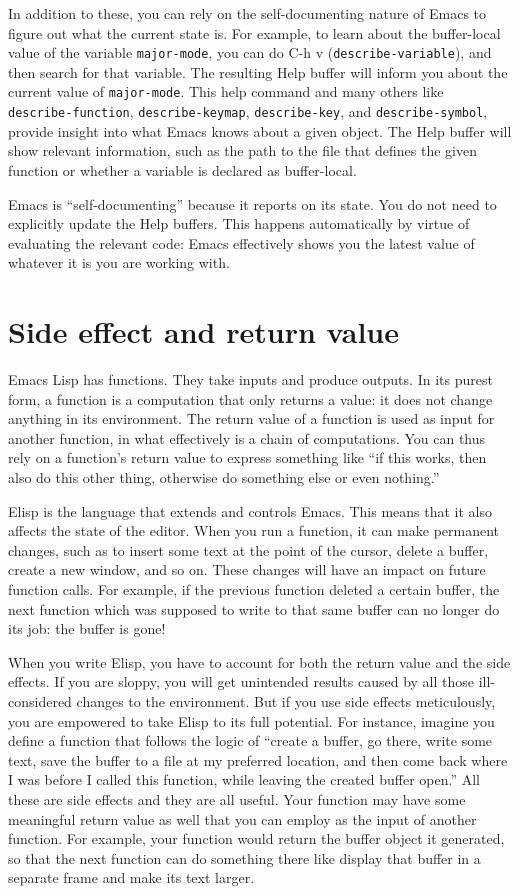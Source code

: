 \documentclass[11pt]{ctexart}
\begin{document}
In addition to these, you can rely on the self-documenting nature of Emacs to figure out what the current state is. For example, to learn about the buffer-local value of the variable \texttt{major-mode}, you can do C-h v (\texttt{describe-variable}), and then search for that variable. The resulting Help buffer will inform you about the current value of \texttt{major-mode}. This help command and many others like \texttt{describe-function}, \texttt{describe-keymap}, \texttt{describe-key}, and \texttt{describe-symbol}, provide insight into what Emacs knows about a given object. The Help buffer will show relevant information, such as the path to the file that defines the given function or whether a variable is declared as buffer-local.

Emacs is ``self-documenting'' because it reports on its state. You do not need to explicitly update the Help buffers. This happens automatically by virtue of evaluating the relevant code: Emacs effectively shows you the latest value of whatever it is you are working with.
\section{Side effect and return value}
\label{sec:org2689823}
Emacs Lisp has functions. They take inputs and produce outputs. In its purest form, a function is a computation that only returns a value: it does not change anything in its environment. The return value of a function is used as input for another function, in what effectively is a chain of computations. You can thus rely on a function's return value to express something like ``if this works, then also do this other thing, otherwise do something else or even nothing.''

Elisp is the language that extends and controls Emacs. This means that it also affects the state of the editor. When you run a function, it can make permanent changes, such as to insert some text at the point of the cursor, delete a buffer, create a new window, and so on. These changes will have an impact on future function calls. For example, if the previous function deleted a certain buffer, the next function which was supposed to write to that same buffer can no longer do its job: the buffer is gone!

When you write Elisp, you have to account for both the return value and the side effects. If you are sloppy, you will get unintended results caused by all those ill-considered changes to the environment. But if you use side effects meticulously, you are empowered to take Elisp to its full potential. For instance, imagine you define a function that follows the logic of ``create a buffer, go there, write some text, save the buffer to a file at my preferred location, and then come back where I was before I called this function, while leaving the created buffer open.'' All these are side effects and they are all useful. Your function may have some meaningful return value as well that you can employ as the input of another function. For example, your function would return the buffer object it generated, so that the next function can do something there like display that buffer in a separate frame and make its text larger.
\end{document}
